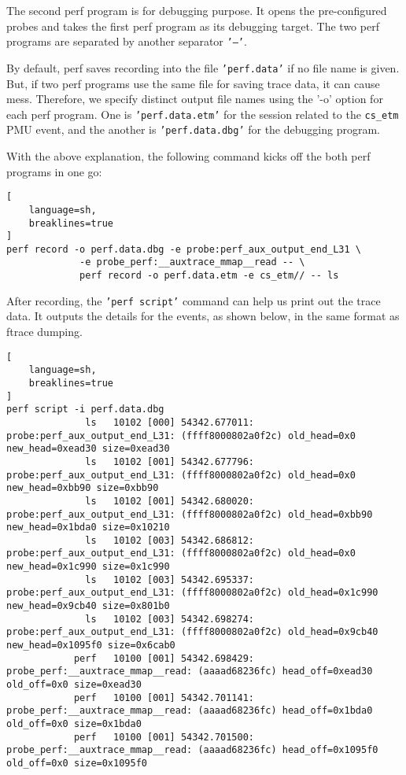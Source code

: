\documentclass[11pt]{diazessay} %
\def\code#1{\texttt{#1}}
\begin{document}
The second perf program is for debugging purpose. It opens the pre-configured
probes and takes the first perf program as its debugging target. The two perf
programs are separated by another separator \code{'---'}.

By default, perf saves recording into the file \code{'perf.data'} if no file
name is given. But, if two perf programs use the same file for saving trace
data, it can cause mess. Therefore, we specify distinct output file names
using the '-o' option for each perf program. One is \code{'perf.data.etm'} for
the session related to the \code{cs\_etm} PMU event, and the another is
\code{'perf.data.dbg'} for the debugging program.

With the above explanation, the following command kicks off the both perf
programs in one go:

\begin{lstlisting}[
  	language=sh,
	breaklines=true
]
perf record -o perf.data.dbg -e probe:perf_aux_output_end_L31 \
             -e probe_perf:__auxtrace_mmap__read -- \
             perf record -o perf.data.etm -e cs_etm// -- ls
\end{lstlisting}

After recording, the \code{'perf script'} command can help us print out the
trace data. It outputs the details for the events, as shown below, in the same
format as ftrace dumping.

\begin{lstlisting}[
  	language=sh,
	breaklines=true
]
perf script -i perf.data.dbg
              ls   10102 [000] 54342.677011:    probe:perf_aux_output_end_L31: (ffff8000802a0f2c) old_head=0x0 new_head=0xead30 size=0xead30
              ls   10102 [001] 54342.677796:    probe:perf_aux_output_end_L31: (ffff8000802a0f2c) old_head=0x0 new_head=0xbb90 size=0xbb90
              ls   10102 [001] 54342.680020:    probe:perf_aux_output_end_L31: (ffff8000802a0f2c) old_head=0xbb90 new_head=0x1bda0 size=0x10210
              ls   10102 [003] 54342.686812:    probe:perf_aux_output_end_L31: (ffff8000802a0f2c) old_head=0x0 new_head=0x1c990 size=0x1c990
              ls   10102 [003] 54342.695337:    probe:perf_aux_output_end_L31: (ffff8000802a0f2c) old_head=0x1c990 new_head=0x9cb40 size=0x801b0
              ls   10102 [003] 54342.698274:    probe:perf_aux_output_end_L31: (ffff8000802a0f2c) old_head=0x9cb40 new_head=0x1095f0 size=0x6cab0
            perf   10100 [001] 54342.698429: probe_perf:__auxtrace_mmap__read: (aaaad68236fc) head_off=0xead30 old_off=0x0 size=0xead30
            perf   10100 [001] 54342.701141: probe_perf:__auxtrace_mmap__read: (aaaad68236fc) head_off=0x1bda0 old_off=0x0 size=0x1bda0
            perf   10100 [001] 54342.701500: probe_perf:__auxtrace_mmap__read: (aaaad68236fc) head_off=0x1095f0 old_off=0x0 size=0x1095f0
\end{lstlisting}
\end{document}
